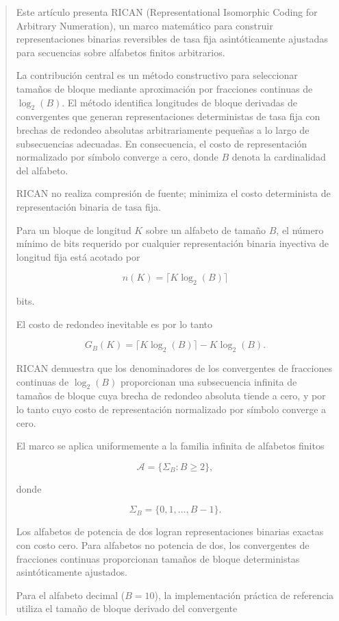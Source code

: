 \documentclass[onecolumn]{IEEEtran}
\begin{document}
\begin{abstract}

Este artículo presenta RICAN (Representational Isomorphic Coding for
Arbitrary Numeration), un marco matemático para construir
representaciones binarias reversibles de tasa fija asintóticamente
ajustadas para secuencias sobre alfabetos finitos arbitrarios.

La contribución central es un método constructivo para seleccionar
tamaños de bloque mediante aproximación por fracciones continuas de
$\log_2(B)$. El método identifica longitudes de bloque derivadas de
convergentes que generan representaciones deterministas de tasa fija
con brechas de redondeo absolutas arbitrariamente pequeñas a lo largo
de subsecuencias adecuadas. En consecuencia, el costo de
representación normalizado por símbolo converge a cero, donde $B$
denota la cardinalidad del alfabeto.

RICAN no realiza compresión de fuente; minimiza el costo determinista
de representación binaria de tasa fija.

Para un bloque de longitud $K$ sobre un alfabeto de tamaño $B$, el
número mínimo de bits requerido por cualquier representación binaria
inyectiva de longitud fija está acotado por

\[
n(K)=\lceil K\log_2(B)\rceil
\]

bits.

El costo de redondeo inevitable es por lo tanto

\[
G_B(K)=
\lceil K\log_2(B)\rceil-K\log_2(B).
\]

RICAN demuestra que los denominadores de los convergentes de
fracciones continuas de $\log_2(B)$ proporcionan una subsecuencia
infinita de tamaños de bloque cuya brecha de redondeo absoluta tiende
a cero, y por lo tanto cuyo costo de representación normalizado por
símbolo converge a cero.

El marco se aplica uniformemente a la familia infinita de alfabetos
finitos

\[
\mathcal{A}=\{\Sigma_B:B\geq2\},
\]

donde

\[
\Sigma_B=\{0,1,\ldots,B-1\}.
\]

Los alfabetos de potencia de dos logran representaciones binarias
exactas con costo cero. Para alfabetos no potencia de dos, los
convergentes de fracciones continuas proporcionan tamaños de bloque
deterministas asintóticamente ajustados.

Para el alfabeto decimal ($B=10$), la implementación práctica de
referencia utiliza el tamaño de bloque derivado del convergente


\end{abstract}
\end{document}
